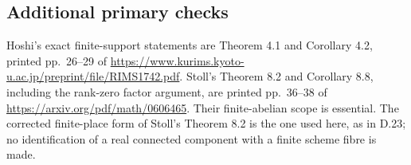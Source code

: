 \subsection*{Additional primary checks}

Hoshi's exact finite-support statements are Theorem 4.1 and
Corollary 4.2, printed pp.~26--29 of
\url{https://www.kurims.kyoto-u.ac.jp/preprint/file/RIMS1742.pdf}.
Stoll's Theorem 8.2 and Corollary 8.8, including the rank-zero
factor argument, are printed pp.~36--38 of
\url{https://arxiv.org/pdf/math/0606465}.
Their finite-abelian scope is essential.  The corrected
finite-place form of Stoll's Theorem 8.2 is the one used here,
as in D.23; no identification of a real connected component with
a finite scheme fibre is made.
